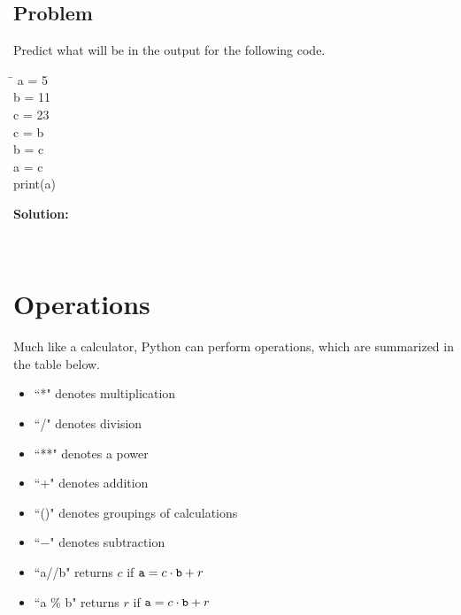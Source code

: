 \documentclass{article}
\newcommand{\icode}[1]{{\ttfamily #1}}
\begin{document}
\subsection{Problem}
Predict what will be in the output for the following code.
\begin{tcolorbox}
	\ttfamily
	\begin{tabbing}
		\hspace{3.25 in}\=\hspace{3.25 in} \kill
		a = 5\\
		b = 11\\
		c = 23\\
		c = b\\
		b = c\\
		a = c\\
		print(a)
	\end{tabbing}
\end{tcolorbox}
\noindent\textbf{Solution:}
\begin{tcolorbox}[colback=output]
	\ttfamily 
	\phantom{11}\\
\end{tcolorbox}
\section{Operations}
Much like a calculator, Python can perform operations, which are summarized in the table below.
\begin{multicols}{2}
\begin{itemize}
	\item ``*" denotes multiplication
	\item ``/" denotes division
	\item ``**" denotes a power
	\item ``+" denotes addition
	\item ``()" denotes groupings of calculations
	\item ``$-$" denotes subtraction
	\item ``\icode{a}//\icode{b}" returns $c$ if $\text{\icode{a}} = c \cdot \text{\icode{b}} + r$
	\item ``\icode{a} \% \icode{b}" returns $r$ if $\text{\icode{a}} = c \cdot \text{\icode{b}} + r$
	
\end{itemize}
\end{multicols}
\end{document}
